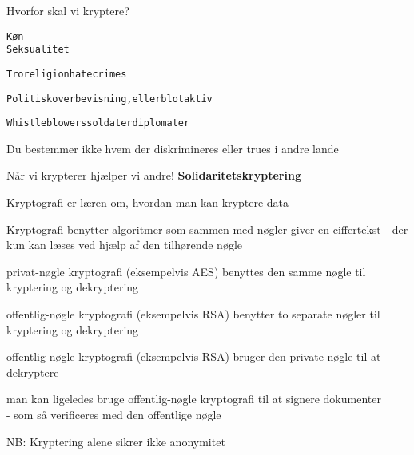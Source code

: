 \documentclass[20pt,landscape,a4paper,footrule]{foils}
\begin{document}
Hvorfor skal vi kryptere?

\begin{alltt}
       Køn
                       Seksualitet

 Tro religion       hatecrimes

 Politisk overbevisning, eller blot aktiv

 Whistleblowers             soldater      diplomater

\end{alltt}

\centerline{Du bestemmer ikke hvem der diskrimineres eller trues i andre lande}

\vskip2cm

Når vi krypterer hjælper vi andre! {\bf Solidaritetskryptering}



\begin{list1}
\item Kryptografi er læren om, hvordan man kan kryptere data
\item Kryptografi benytter algoritmer som sammen med nøgler giver en
  ciffertekst - der kun kan læses ved hjælp af den tilhørende nøgle
\end{list1}



\begin{list1}
\item privat-nøgle kryptografi (eksempelvis AES) benyttes den samme
  nøgle til kryptering og dekryptering
\item offentlig-nøgle kryptografi (eksempelvis RSA) benytter to
  separate nøgler til kryptering og dekryptering
\end{list1}



\begin{list1}
\item offentlig-nøgle kryptografi (eksempelvis RSA) bruger den private
  nøgle til at dekryptere
\item man kan ligeledes bruge offentlig-nøgle kryptografi til at
  signere dokumenter\\ - som så verificeres med den offentlige nøgle
\item NB: Kryptering alene sikrer ikke anonymitet
\end{list1}
\end{document}
